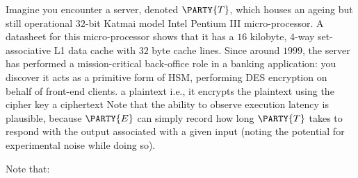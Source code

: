 %



Imagine you encounter a server, denoted 
$\PARTY{T}$, 
which houses an ageing but still operational $32$-bit Katmai model Intel 
Pentium III micro-processor.  
A datasheet for this micro-processor shows that it has a $16$ kilobyte, 
$4$-way set-associative L1 data cache with $32$ byte cache lines.  Since
around $1999$, the server has performed a mission-critical back-office 
role in a banking application: you discover it acts as a primitive form 
of HSM, performing DES encryption on behalf of front-end clients.
{a  plaintext}
{i.e., it encrypts the plaintext using the cipher key}
{a ciphertext}
Note that the ability to observe execution latency is plausible, because
$\PARTY{E}$ 
can simply record how long
$\PARTY{T}$ 
takes to respond with the output associated with a given input (noting the potential for experimental noise while doing so).




%
Note that:

